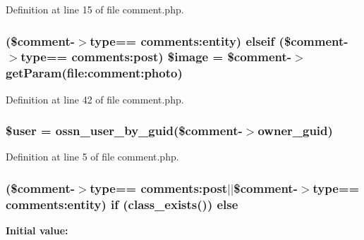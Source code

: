 Definition at line 15 of file comment.\+php.

\subsubsection[{\texorpdfstring{\$image}{$image}}]{ (\$comment-\/$>${\bf type}== \textquotesingle{}comments\+:entity\textquotesingle{}) {\bf elseif} (\$comment-\/$>${\bf type}== \textquotesingle{}comments\+:post\textquotesingle{}) \$image = \$comment-\/$>$get\+Param(\textquotesingle{}file\+:comment\+:photo\textquotesingle{})}\hypertarget{plugins_2default_2comments_2templates_2comment_8php_adf56429d29923e0dfe528abe73b5ae55}{}\label{plugins_2default_2comments_2templates_2comment_8php_adf56429d29923e0dfe528abe73b5ae55}


Definition at line 42 of file comment.\+php.

\subsubsection[{\texorpdfstring{\$user}{$user}}]{\setlength{\rightskip}{0pt plus 5cm}\${\bf user} = {\bf ossn\+\_\+user\+\_\+by\+\_\+guid}(\$comment-\/$>${\bf owner\+\_\+guid})}\hypertarget{plugins_2default_2comments_2templates_2comment_8php_a598ca4e71b15a1313ec95f0df1027ca5}{}\label{plugins_2default_2comments_2templates_2comment_8php_a598ca4e71b15a1313ec95f0df1027ca5}


Definition at line 5 of file comment.\+php.

\subsubsection[{\texorpdfstring{else}{else}}]{ (\$comment-\/$>${\bf type}== \textquotesingle{}comments\+:post\textquotesingle{}$\vert$$\vert$\$comment-\/$>${\bf type}== \textquotesingle{}comments\+:entity\textquotesingle{}) {\bf if} (class\+\_\+exists(\textquotesingle{})) else}\hypertarget{plugins_2default_2comments_2templates_2comment_8php_a0fee8603373d27f87efcccd55f4be6dc}{}\label{plugins_2default_2comments_2templates_2comment_8php_a0fee8603373d27f87efcccd55f4be6dc}
{\bfseries Initial value\+:}


